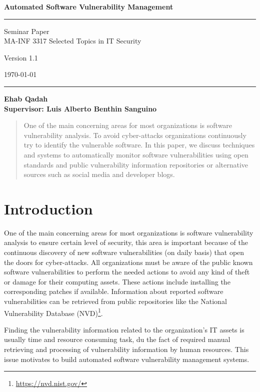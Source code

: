 \documentclass{llncs}
\begin{document}
\begin{flushleft}
 
 \thispagestyle{empty}
\centering\LARGE {\bf Automated Software Vulnerability Management}


\rule{\textwidth}{1pt}

\vspace{2pt}


\centering
 Seminar Paper  
 \\MA-INF 3317 Selected Topics in IT Security

{\Large Version 1.1 }

\vspace{8pt}
\today

\rule{\textwidth}{1pt}

\vspace{8 cm}

\centering
 \bf Ehab Qadah\\
 
 \vspace{7 pt}
\bf Supervisor: Luis Alberto Benthin Sanguino

\end{flushleft}


\newpage

\tableofcontents

\newpage


\begin{abstract}
One of the main concerning areas for most organizations is software vulnerability analysis. To avoid cyber-attacks organizations continuously try to identify the vulnerable software. In this paper, we discuss techniques and systems to automatically monitor software vulnerabilities using open standards and public vulnerability information repositories or alternative sources such as social media and developer blogs. 
\end{abstract}

\section{Introduction}

\par One of the main concerning areas for most organizations is software vulnerability analysis to ensure certain level of security, this area is important because of the continuous discovery of new software vulnerabilities (on daily basis) that open the doors for cyber-attacks. All organizations must be aware of the public known software vulnerabilities to perform the needed actions to avoid any kind of theft or damage for their computing assets. These actions include installing the corresponding patches if available. Information about reported software vulnerabilities can be retrieved from public repositories like the National Vulnerability Database (NVD)\footnote{\url{https://nvd.nist.gov/}}. 
\par Finding the vulnerability information related to the organization's IT assets is usually time and resource consuming task, du the fact of required manual retrieving and processing of vulnerability information by human resources. This issue motivates to build automated software vulnerability management systems. 
 
\end{document}
